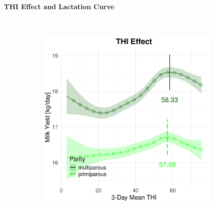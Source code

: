 \newpage
\paragraph{THI Effect and Lactation Curve} \quad \\
\begin{figure}[H]
    \centering
    \begin{subfigure}[b]{0.45\textwidth}
        \centering
        \includegraphics[width=\textwidth]{thesis/figures/models/milk/before2010/je_milk_before2010/je_milk_before2010_marginal_thi_milk_combined.png}
    \end{subfigure}
    \hspace{0.05\textwidth} %
    \begin{subfigure}[b]{0.45\textwidth}
        \centering

\end{subfigure}
\end{figure}
